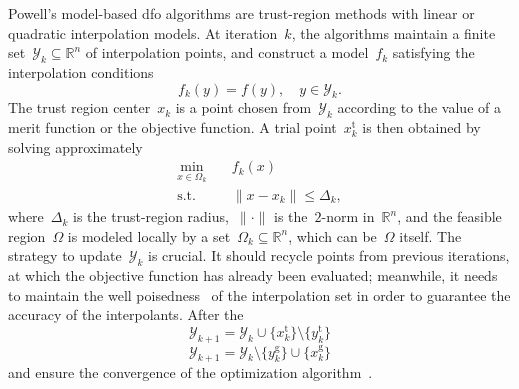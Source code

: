 \documentclass[11pt,draft]{article}
\numberwithin{equation}{section}
\def\R{\ensuremath{\mathbb{R}}}
\newcommand\norm[2][]{#1\|#2#1\|}
\def\obj{\ensuremath{f}}
\def\srchsp{\ensuremath{\Omega}}
\newcommand\objmdl[1][k]{\obj_{#1}}
\newcommand\srchspmdl[1][k]{\Omega_{#1}}
\newcommand\iter[1][k]{x_{#1}}
\newcommand\trg[1][k]{\Delta_{#1}}
\newcommand\itpls[1][k]{\mathcal{Y}_{#1}}
\newcommand\trial{{\text{t}}}
\newcommand\geo{{\text{g}}}
\begin{document}
Powell's model-based \gls{dfo} algorithms are trust-region methods with linear or quadratic interpolation models.
At iteration~$k$, the algorithms maintain a finite set~$\itpls \subseteq \R^n$ of interpolation points, and construct a model~$\objmdl$ satisfying the interpolation conditions
\begin{equation}
    \label{eq:itpls}
    \objmdl(y) = \obj(y), \quad y \in \itpls.
\end{equation}
The trust region center~$\iter$ is a point chosen from~$\itpls$ according to the value of a merit function or the objective function.
A trial point~$\iter^{\trial}$ is then obtained by solving approximately
\begin{subequations}
    \label{eq:trsp}
    \begin{align}
        \min_{x \in \srchspmdl} & \quad \objmdl(x)\\
        \text{s.t.}             & \quad \norm{x - \iter} \le \trg, \label{eq:trsp-tr}
    \end{align}
\end{subequations}
where~$\trg$ is the trust-region radius,~$\norm{\cdot}$ is the~$2$-norm in~$\R^n$, and the feasible region~$\srchsp$ is modeled locally by a set~$\srchspmdl \subseteq \R^n$, which can be~$\srchsp$ itself.
The strategy to update~$\itpls$ is crucial.
It should recycle points from previous iterations, at which the objective function has already been evaluated; meanwhile, it needs to maintain the well poisedness~\cite{Sauer_Xu_1995,Conn_Scheinberg_Vicente_2009b} of the interpolation set in order to guarantee the accuracy of the interpolants.
After the
$$\itpls[k+1] = \itpls \cup \{\iter^{\trial}\} \setminus\{y_k^{\trial}\}$$
$$\itpls[k+1] = \itpls \setminus\{y_k^{\geo}\} \cup \{\iter^{\geo}\}$$
and ensure the convergence of the optimization algorithm~\cite{Conn_Scheinberg_Vicente_2008a,Conn_Scheinberg_Vicente_2008b,Fasano_Morales_Nocedal_2009,Scheinberg_Toint_2010}.

\subsection{\texorpdfstring{}{COBYLA}}
\end{document}
